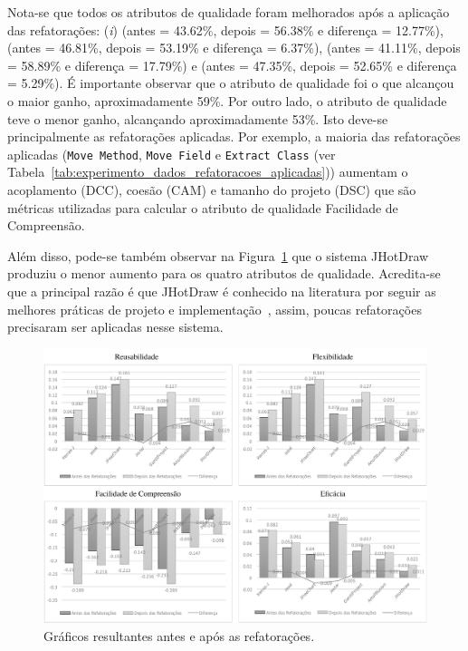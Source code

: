 Nota-se que todos os atributos de qualidade foram melhorados após a aplicação das refatorações: (\textit{i})  (antes = 43.62\%, depois = 56.38\% e diferença = 12.77\%),  (antes = 46.81\%, depois = 53.19\% e diferença = 6.37\%),  (antes = 41.11\%, depois = 58.89\% e diferença = 17.79\%) e  (antes = 47.35\%, depois = 52.65\% e diferença = 5.29\%).
É importante observar que o atributo de qualidade  foi o que alcançou o maior ganho, aproximadamente 59\%. Por outro lado, o atributo de qualidade  teve o menor ganho, alcançando aproximadamente 53\%. Isto deve-se principalmente as refatorações aplicadas. Por exemplo, a maioria das refatorações aplicadas (\texttt{Move Method}, \texttt{Move Field} e \texttt{Extract Class} (ver Tabela~\ref{tab:experimento_dados_refatoracoes_aplicadas})) aumentam o acoplamento (DCC), coesão (CAM) e tamanho do projeto (DSC) que são métricas utilizadas para calcular o atributo de qualidade Facilidade de Compreensão.

Além disso, pode-se também observar na Figura~\ref{fig:barchartRefactoringBeforeAndAfter} que o sistema JHotDraw produziu o menor aumento para os quatro atributos de qualidade. Acredita-se que a principal razão é que JHotDraw é conhecido na literatura por seguir as melhores práticas de projeto e implementação~\cite{Kessentini_2010}, assim, poucas refatorações precisaram ser aplicadas nesse sistema.


\begin{figure}[h]
	\centering
	\caption{Gráficos resultantes antes e após as refatorações.}
	\label{fig:barchartRefactoringBeforeAndAfter}
	\includegraphics[scale=0.7]{images/GraficoDeBarraTodasDia140116}
	\fautor
\end{figure}


